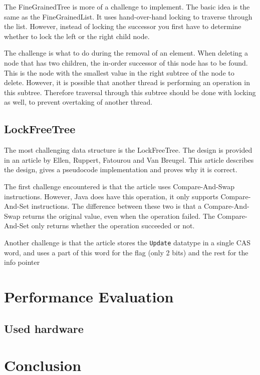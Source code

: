 \documentclass[a4paper]{article}
\begin{document}
The FineGrainedTree is more of a challenge to implement. The basic idea is the same as the
FineGrainedList. It uses hand-over-hand locking to traverse through the list. However,
instead of locking the successor you first have to determine whether to lock the left or
the right child node.

The challenge is what to do during the removal of an element. When deleting a node that
has two children, the in-order successor of this node has to be found. This is the node
with the smallest value in the right subtree of the node to delete. However, it is 
possible that another thread is performing an operation in this subtree. Therefore 
traversal through this subtree should be done with locking as well, to prevent overtaking
of another thread.

\subsection{LockFreeTree}

The most challenging data structure is the LockFreeTree. The design is provided in an 
article by Ellen, Ruppert, Fatourou and Van Breugel.\cite{lft} This article describes the
design, gives a pseudocode implementation and proves why it is correct.

The first challenge encountered is that the article uses Compare-And-Swap instructions.
However, Java does have this operation, it only supports Compare-And-Set instructions. The
difference between these two is that a Compare-And-Swap returns the original value, even
when the operation failed. The Compare-And-Set only returns whether the operation 
succeeded or not. %

Another challenge is that the article stores the \texttt{Update} datatype in a single CAS
word, and uses a part of this word for the flag (only 2 bits) and the rest for the info
pointer

\section{Performance Evaluation}

\subsection{Used hardware}

\section{Conclusion}
\end{document}
